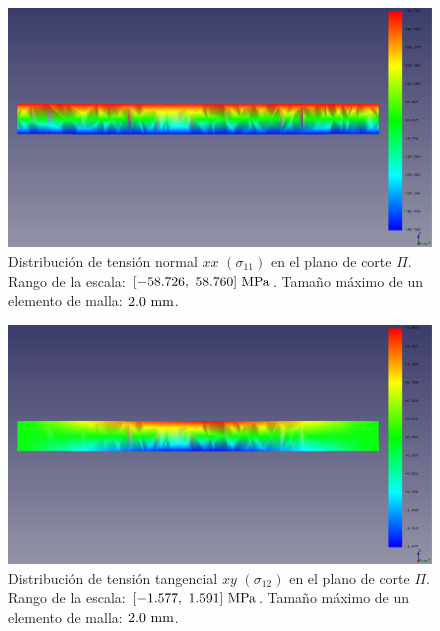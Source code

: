 \begin{figure}[H]
    \centering
    \includegraphics[width=\textwidth]{figures/resultados/stress_vector_x_20.pdf}
    \caption{Distribución de tensión normal $xx$ $(\sigma_{11})$ en el plano de corte $\Pi$. Rango de la escala: $[-58.726, \ 58.760] \ \mega\pascal$. Tamaño máximo de un elemento de malla: $2.0 \ \milli\meter$.}
    \label{fig:stress_vector_x_20}
\end{figure}

\begin{figure}[H]
    \centering
    \includegraphics[width=\textwidth]{figures/resultados/stress_vector_y_20.pdf}
    \caption{Distribución de tensión tangencial $xy$ $(\sigma_{12})$ en el plano de corte $\Pi$. Rango de la escala: $[-1.577, \ 1.591] \ \mega\pascal$. Tamaño máximo de un elemento de malla: $2.0 \ \milli\meter$.}
    \label{fig:stress_vector_y_20}
\end{figure}

